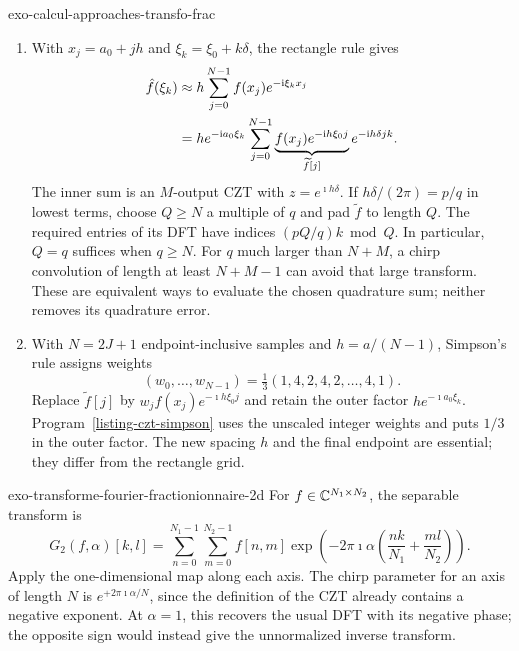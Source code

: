 \begin{correction}{exo-calcul-approaches-transfo-frac}
\begin{enumerate}
\item With $x_j=a_0+jh$ and $\xi_k=\xi_0+k\delta$, the rectangle rule gives
\begin{align*}
 \hat{f}(\xi_k)&\approx h\sum_{j=0}^{N-1}f(x_j)e^{-\mathrm{i}\xi_k x_j}\\
 &=h e^{-\mathrm{i} a_0\xi_k}\sum_{j=0}^{N-1}
 \underbrace{f(x_j)e^{-\mathrm{i} h\xi_0j}}_{\widetilde f[j]}
 e^{-\mathrm{i} h\delta jk}.
\end{align*}
The inner sum is an $M$-output CZT with $z=e^{\imath h\delta}$.
If $h\delta/(2\pi)=p/q$ in lowest terms, choose $Q\geq N$ a multiple
of $q$ and pad $\widetilde f$ to length $Q$. The required entries of its
DFT have indices $(pQ/q)k\bmod Q$. In particular, $Q=q$ suffices when
$q\geq N$. For $q$ much larger than $N+M$, a chirp convolution of length
at least $N+M-1$ can avoid that large transform. These are equivalent
ways to evaluate the chosen quadrature sum; neither removes its
quadrature error.
\item With $N=2J+1$ endpoint-inclusive samples and $h=a/(N-1)$, Simpson's
rule assigns weights
\[
 (w_0,\ldots,w_{N-1})=\tfrac13(1,4,2,4,2,\ldots,4,1).
\]
Replace $\widetilde f[j]$ by $w_jf(x_j)e^{-\imath h\xi_0j}$ and retain the
outer factor $h e^{-\imath a_0\xi_k}$. Program~\ref{listing-czt-simpson}
uses the unscaled integer weights and puts $1/3$ in the outer factor.
The new spacing $h$ and the final endpoint are essential; they differ
from the rectangle grid.
\begin{listing}[H]
\caption{Fourier-integral quadrature with Simpson weights and physical phases.}
\label{listing-czt-simpson}
\end{listing}
\end{enumerate}
\end{correction}

\begin{correction}{exo-transforme-fourier-fractionionnaire-2d}
For $f\in\mathbb{C}^{N_1\times N_2}$, the separable transform is
\[
 G_2(f,\alpha)[k,l]=\sum_{n=0}^{N_1-1}\sum_{m=0}^{N_2-1}
 f[n,m]\exp\left(-2\pi\imath\alpha\left(\frac{nk}{N_1}+\frac{ml}{N_2}\right)\right).
\]
Apply the one-dimensional map along each axis. The chirp parameter for an
axis of length $N$ is $e^{+2\pi\imath\alpha/N}$, since the definition
of the CZT already contains a negative exponent. At $\alpha=1$, this
recovers the usual DFT with its negative phase; the opposite sign would
instead give the unnormalized inverse transform.
\begin{listing}[H]
\caption{A scaled-frequency Fourier transform with the DFT sign convention.}
\label{listing-frft}
\end{listing}
\begin{listing}[H]
\caption{A scaled-frequency Fourier transform along both array axes.}
\label{listing-frft2d}
\end{listing}
\end{correction}
